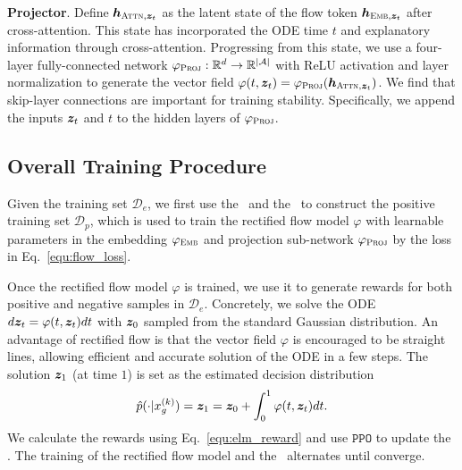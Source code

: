 \textbf{Projector}. Define ${\bm{h}}_{\textsc{Attn},{\bm{z}}_t}$ as the latent state of the flow token ${\bm{h}}_{\textsc{Emb},{\bm{z}}_t}$ after cross-attention. This state has incorporated the ODE time $t$ and explanatory information through cross-attention. Progressing from this state, we use a four-layer fully-connected network $\varphi_{\textsc{Proj}}:\mathbb{R}^d\rightarrow\mathbb{R}^{|\mathcal{A}|}$ with ReLU activation and layer normalization to generate the vector field $\varphi(t,{\bm{z}}_t) = \varphi_{\textsc{Proj}}({\bm{h}}_{\textsc{Attn},{\bm{z}}_t})$. We find that skip-layer connections are important for training stability. Specifically, we append the inputs ${\bm{z}}_t$ and $t$ to the hidden layers of $\varphi_{\textsc{Proj}}$.

\subsection{Overall Training Procedure}
Given the training set $\mathcal{D}_e$, we first use the \elm~and the \rlm~to construct the positive training set $\mathcal{D}_p$, which is used to train the rectified flow model $\varphi$ with learnable parameters in the embedding $\varphi_{\textsc{Emb}}$ and projection sub-network $\varphi_{\textsc{Proj}}$ by the loss in Eq.~\ref{equ:flow_loss}.

Once the rectified flow model $\varphi$ is trained, we use it to generate rewards for both positive and negative samples in $\mathcal{D}_e$. Concretely, we solve the ODE $d{\bm{z}}_t = \varphi(t, {\bm{z}}_t)dt$ with ${\bm{z}}_0$ sampled from the standard Gaussian distribution. An advantage of rectified flow is that the vector field $\varphi$ is encouraged to be straight lines, allowing efficient and accurate solution of the ODE in a few steps. The solution ${\bm{z}}_1$ (at time $1$) is set as the estimated decision distribution
\begin{align}
    \hat{p}(\cdot|\idx[x][g][k])=\vz_1=\vz_0+\int_0^1 \varphi(t,\vz_t)dt.
\end{align}
We calculate the rewards using Eq.~\ref{equ:elm_reward} and use $\mathtt{PPO}$ to update the \rlm. The training of the rectified flow model and the \rlm~alternates until converge.



